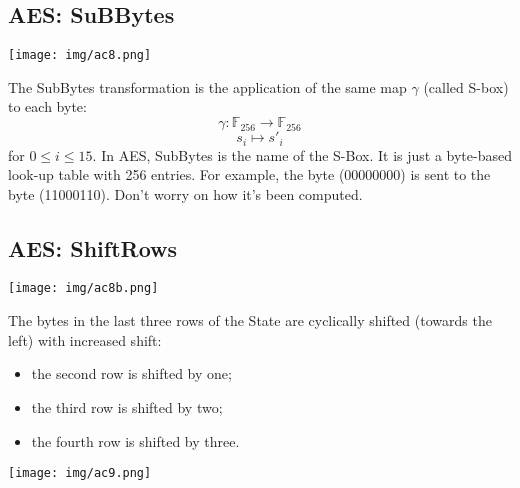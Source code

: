 \documentclass[a4paper, 10pt, titlepage]{article}
\begin{document}
\subsection{AES: SuBBytes}
\begin{minipage}{0.3\textwidth}
\texttt{[image: img/ac8.png]}
\end{minipage}
\begin{minipage}{0.6\textwidth}
The SubBytes transformation is the application of the same map $\gamma$ (called S-box) to each byte:
$$\gamma: \mathbb{F}_{256} \rightarrow \mathbb{F}_{256}$$
$$s_i \mapsto s'_i$$
for $0 \leq i \leq 15$.
In AES, SubBytes is the name of the S-Box. It is just a byte-based look-up table with 256 entries. For example, the byte (00000000) is sent to the byte (11000110). Don't worry on how it's been computed.
\end{minipage}
\subsection{AES: ShiftRows}
\begin{minipage}{0.3\textwidth}
\texttt{[image: img/ac8b.png]}
\end{minipage}
\begin{minipage}{0.6\textwidth}
The bytes in the last three rows of the State are cyclically shifted (towards the left) with increased shift:
\begin{itemize}
\item the second row is shifted by one;
\item the third row is shifted by two;
\item the fourth row is shifted by three.
\end{itemize}
\texttt{[image: img/ac9.png]}
\end{minipage}
\end{document}
